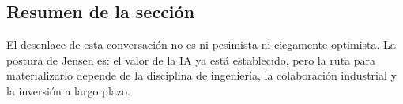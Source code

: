 \subsection{Resumen de la sección}

El desenlace de esta conversación no es ni pesimista ni ciegamente optimista. La postura de Jensen es: el valor de la IA ya está establecido, pero la ruta para materializarlo depende de la disciplina de ingeniería, la colaboración industrial y la inversión a largo plazo.

